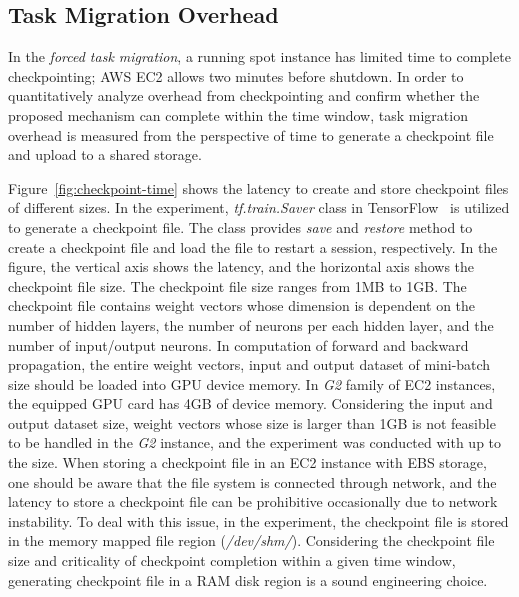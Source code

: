 \documentclass[conference]{IEEEtran}
\begin{document}
\subsection{Task Migration Overhead}
In the \textit{forced task migration}, a running spot instance has limited time to complete checkpointing; AWS EC2 allows two minutes before shutdown. In order to quantitatively analyze overhead from checkpointing and confirm whether the proposed mechanism can complete within the time window, task migration overhead is measured from the perspective of time to generate a checkpoint file and upload to a shared storage.

Figure~\ref{fig:checkpoint-time} shows the latency to create and store checkpoint files of different sizes. In the experiment, \textit{tf.train.Saver} class in TensorFlow~\cite{tensorflow} is utilized to generate a checkpoint file. The class provides \textit{save} and \textit{restore} method to create a checkpoint file and load the file to restart a session, respectively. In the figure, the vertical axis shows the latency, and the horizontal axis shows the checkpoint file size. The checkpoint file size ranges from 1MB to 1GB. The checkpoint file contains weight vectors whose dimension is dependent on the number of hidden layers, the number of neurons per each hidden layer, and the number of input/output neurons. In computation of forward and backward propagation, the entire weight vectors, input and output dataset of mini-batch size should be loaded into GPU device memory. In \textit{G2} family of EC2 instances, the equipped GPU card has 4GB of device memory. Considering the input and output dataset size, weight vectors whose size is larger than 1GB is not feasible to be handled in the \textit{G2} instance, and the experiment was conducted with up to the size. When storing a checkpoint file in an EC2 instance with EBS storage, one should be aware that the file system is connected through network, and the latency to store a checkpoint file can be prohibitive occasionally due to network instability. To deal with this issue, in the experiment, the checkpoint file is stored in the memory mapped file region (\emph{/dev/shm/}). Considering the checkpoint file size and criticality of checkpoint completion within a given time window, generating checkpoint file in a RAM disk region is a sound engineering choice. 
\end{document}
